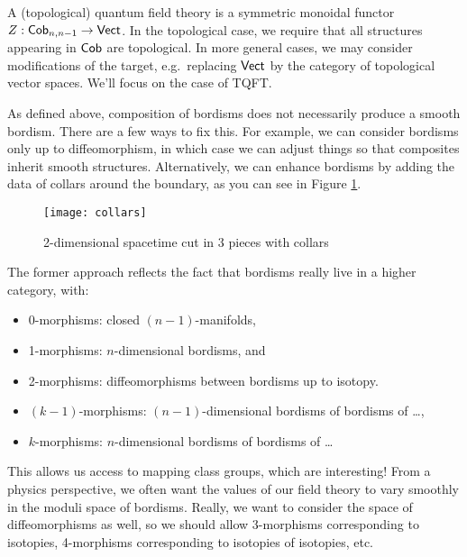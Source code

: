 A (topological) quantum field theory is a symmetric monoidal functor $Z: \mathsf{Cob}_{n,n-1} \to \mathsf{Vect}$.
In the topological case, we require that all structures appearing in $\mathsf{Cob}$ are topological.
In more general cases, we may consider modifications of the target, e.g.\ replacing $\mathsf{Vect}$ by the category of topological vector spaces.
We'll focus on the case of TQFT.

As defined above, composition of bordisms does not necessarily produce a smooth bordism.
There are a few ways to fix this.
For example, we can consider bordisms only up to diffeomorphism, in which case we can adjust things so that composites inherit smooth structures.
Alternatively, we can enhance bordisms by adding the data of collars around the boundary, as you can see in Figure \ref{fig:collars}.


\begin{figure}[h]
\centering
\texttt{[image: collars]}
\caption{2-dimensional spacetime cut in 3 pieces with collars}
\label{fig:collars}
\end{figure}

The former approach reflects the fact that bordisms really live in a higher category, with:
\begin{itemize}
	\item 0-morphisms: closed $(n-1)$-manifolds,
	\item 1-morphisms: $n$-dimensional bordisms, and
	\item 2-morphisms: diffeomorphisms between bordisms up to isotopy.
	\item $(k - 1)$-morphisms: $(n-1)$-dimensional bordisms of bordisms of \dots,
	\item $k$-morphisms: $n$-dimensional bordisms of bordisms of \dots
\end{itemize}
This allows us access to mapping class groups, which are interesting!
From a physics perspective, we often want the values of our field theory to vary smoothly in the moduli space of bordisms.
Really, we want to consider the space of diffeomorphisms as well, so we should allow 3-morphisms corresponding to isotopies, 4-morphisms corresponding to isotopies of isotopies, etc.

